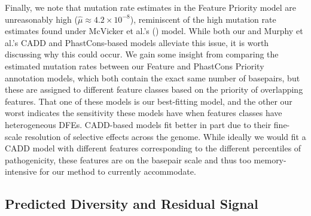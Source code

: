 \documentclass[11pt]{article}
\begin{document}
Finally, we note that mutation rate estimates in the Feature Priority model are
unreasonably high ($\widehat{\mu} \approx 4.2 \times 10^{-8}$), reminiscent of
the high mutation rate estimates found under McVicker et al.'s
(\citeyear{McVicker2009-ax}) model. While both our and Murphy et al.'s CADD and
PhastCons-based models alleviate this issue, it is worth discussing why this
could occur. We gain some insight from comparing the estimated mutation rates
between our Feature and PhastCons Priority annotation models, which both
contain the exact same number of basepairs, but these are assigned to different
feature classes based on the priority of overlapping features. That one of
these models is our best-fitting model, and the other our worst indicates the
sensitivity these models have when features classes have heterogeneous DFEs.
CADD-based models fit better in part due to their fine-scale resolution of
selective effects across the genome. While ideally we would fit a CADD model
with different features corresponding to the different percentiles of
pathogenicity, these features are on the basepair scale and thus too
memory-intensive for our method to currently accommodate.

\subsection*{Predicted Diversity and Residual Signal}
\end{document}
